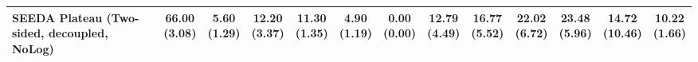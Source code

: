\begin{table}[H]
{\begin{tabular}{l|cccccc|cccccc}
SEEDA Plateau (Two-sided, decoupled, NoLog) & \bfseries \makecell{66.00 \\ (3.08)} & \makecell{5.60 \\ (1.29)} & {\cellcolor[HTML]{C8E6C9}} \makecell{12.20 \\ (3.37)} & \makecell{11.30 \\ (1.35)} & \makecell{4.90 \\ (1.19)} & \makecell{0.00 \\ (0.00)} & \makecell{12.79 \\ (4.49)} & \makecell{16.77 \\ (5.52)} & {\cellcolor[HTML]{C8E6C9}} \makecell{22.02 \\ (6.72)} & \bfseries \makecell{23.48 \\ (5.96)} & \makecell{14.72 \\ (10.46)} & \makecell{10.22 \\ (1.66)} \\
\bottomrule
\end{tabular}
}%
\end{table}
